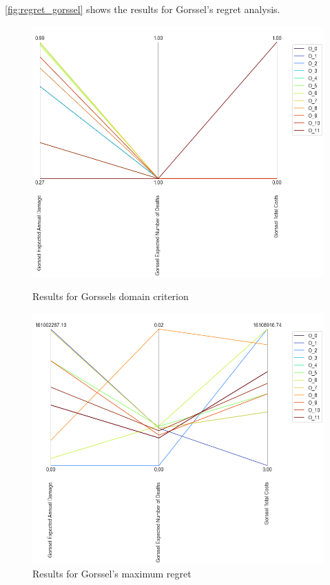 \autoref{fig:regret_gorssel} shows the results for Gorssel's regret analysis. 



\begin{figure}[H]
  \centering
  \begin{minipage}[b]{0.4\textwidth}
    \includegraphics[width=1.15\textwidth]{report/figures/results/domain_criterion_Gorssel.png}
    \caption{Results for Gorssels domain criterion}
    \label{fig:domain_criterion_gorssel}
  \end{minipage}
  \hfill
  \begin{minipage}[b]{0.4\textwidth}
    \includegraphics[width=1.15\textwidth]{report/figures/results/regret_figure_Gorssel.png}
    \caption{Results for Gorssel's maximum regret}
    \label{fig:regret_gorssel}
  \end{minipage}
\end{figure}




